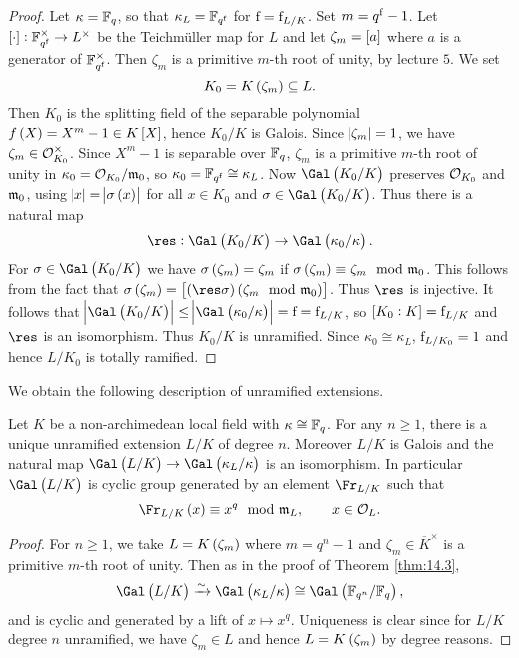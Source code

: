\begin{proof}
Let $ \kappa = \mathbb{F}_q $, so that $ \kappa_L = \mathbb{F}_{q^{\mathrm{f}}} $ for $ \mathrm{f} = \mathrm{f}_{L / K} $. Set $ m = q^{\mathrm{f}} - 1 $. Let $ \sbr{\cdot} : \FF_{q^\f}^\times \to L^\times $ be the Teichm\"uller map for $ L $ and let $ \zeta_m = \sbr{a} $ where $ a $ is a generator of $ \mathbb{F}_{q^{\mathrm{f}}}^\times $. Then $ \zeta_m $ is a primitive $ m $-th root of unity, by lecture $ 5 $. We set
$$ K_0 = K\br{\zeta_m} \subseteq L. $$
Then $ K_0 $ is the splitting field of the separable polynomial $ f\br{X} = X^m - 1 \in K\sbr{X} $, hence $ K_0 / K $ is Galois. Since $ \abs{\zeta_m} = 1 $, we have $ \zeta_m \in \mathcal{O}_{K_0}^\times $. Since $ X^m - 1 $ is separable over $ \mathbb{F}_q $, $ \zeta_m $ is a primitive $ m $-th root of unity in $ \kappa_0 = \mathcal{O}_{K_0} / \mathfrak{m}_0 $, so $ \kappa_0 = \mathbb{F}_{q^{\mathrm{f}}} \cong \kappa_L $. Now $ \Gal\br{K_0 / K} $ preserves $ \mathcal{O}_{K_0} $ and $ \mathfrak{m}_0 $, using $ \abs{x} = \abs{\sigma\br{x}} $ for all $ x \in K_0 $ and $ \sigma \in \Gal\br{K_0 / K} $. Thus there is a natural map
$$ \res : \Gal\br{K_0 / K} \to \Gal\br{\kappa_0 / \kappa}. $$
For $ \sigma \in \Gal\br{K_0 / K} $ we have $ \sigma\br{\zeta_m} = \zeta_m $ if $ \sigma\br{\zeta_m} \equiv \zeta_m \mod \mmm_0 $. This follows from the fact that $ \sigma\br{\zeta_m} = \sbr{\br{\res \sigma}\br{\zeta_m \mod \mmm_0}} $. Thus $ \res $ is injective. It follows that $ \abs{\Gal\br{K_0 / K}} \le \abs{\Gal\br{\kappa_0 / \kappa}} = \f = \f_{L / K} $, so $ \sbr{K_0 : K} = \f_{L / K} $ and $ \res $ is an isomorphism. Thus $ K_0 / K $ is unramified. Since $ \kappa_0 \cong \kappa_L $, $ \mathrm{f}_{L / K_0} = 1 $ and hence $ L / K_0 $ is totally ramified.
\end{proof}

We obtain the following description of unramified extensions.

\begin{theorem}
\label{thm:14.4}
Let $ K $ be a non-archimedean local field with $ \kappa \cong \mathbb{F}_q $. For any $ n \ge 1 $, there is a unique unramified extension $ L / K $ of degree $ n $. Moreover $ L / K $ is Galois and the natural map $ \Gal\br{L / K} \to \Gal\br{\kappa_L / \kappa} $ is an isomorphism. In particular $ \Gal\br{L / K} $ is cyclic group generated by an element $ \Fr_{L / K} $ such that
$$ \Fr_{L / K}\br{x} \equiv x^q \mod \mmm_L, \qquad x \in \OOO_L. $$
\end{theorem}

\pagebreak

\begin{proof}
For $ n \ge 1 $, we take $ L = K\br{\zeta_m} $ where $ m = q^n - 1 $ and $ \zeta_m \in \overline{K}^\times $ is a primitive $ m $-th root of unity. Then as in the proof of Theorem \ref{thm:14.3},
$$ \Gal\br{L / K} \xrightarrow{\sim} \Gal\br{\kappa_L / \kappa} \cong \Gal\br{\FF_{q^n} / \FF_q}, $$
and is cyclic and generated by a lift of $ x \mapsto x^q $. Uniqueness is clear since for $ L / K $ degree $ n $ unramified, we have $ \zeta_m \in L $ and hence $ L = K\br{\zeta_m} $ by degree reasons.
\end{proof}

